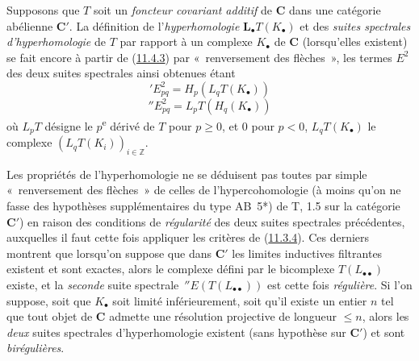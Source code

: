 \begin{env}[11.6.2]
\label{0.11.6.2-fr}
Supposons que $T$ soit un \emph{foncteur covariant additif} de $\boldsymbol{C}$ dans une
catégorie abélienne $\boldsymbol{C}'$. La définition de
l'\emph{hyperhomologie} $\mathbf{L}_\bullet T(K_\bullet)$ et des \emph{suites
spectrales d'hyperhomologie} de $T$ par rapport à un complexe $K_\bullet$ de
$\boldsymbol{C}$ (lorsqu'elles existent) se fait encore à partir de
(\hyperref[0.11.4.3-fr]{11.4.3}) par «~renversement des flèches~», les termes
$E^2$ des deux suites spectrales ainsi obtenues étant
\[
\label{0.11.6.2.1-fr}
\tag{11.6.2.1}
{}'E^2_{pq}=H_p(L_qT(K_\bullet))
\]
\[
\label{0.11.6.2.2-fr}
\tag{11.6.2.2}
{}''E^2_{pq}=L_pT(H_q(K_\bullet))
\]
où $L_pT$ désigne le $p$\textsuperscript{e} dérivé de $T$ pour $p\geq 0$, et $0$
pour $p<0$, $L_qT(K_\bullet)$ le complexe
$(L_qT(K_i))_{i\in\mathbb Z}$.

Les propriétés de l'hyperhomologie ne se déduisent pas toutes par simple
«~renversement des flèches~» de celles de l'hypercohomologie (à moins qu'on
ne fasse des hypothèses supplémentaires du type AB~5*) de T, 1.5 sur la
catégorie $\boldsymbol{C}'$) en raison des conditions de \emph{régularité} des deux
suites spectrales précédentes, auxquelles il faut cette fois appliquer les
critères de (\hyperref[0.11.3.4-fr]{11.3.4}). Ces derniers montrent que
lorsqu'on suppose que dans $\boldsymbol{C}'$ les limites inductives filtrantes
existent et sont exactes, alors le complexe défini par le bicomplexe
$T(L_{\bullet\bullet})$ existe, et la \emph{seconde} suite spectrale
$\,{}''E(T(L_{\bullet\bullet}))$ est cette fois \emph{régulière}. Si l'on suppose,
soit que $K_\bullet$ soit limité inférieurement, soit qu'il existe un entier
$n$ tel que tout objet de $\boldsymbol{C}$ admette une résolution projective de
longueur $\leq n$, alors les \emph{deux} suites spectrales d'hyperhomologie existent
(sans hypothèse sur $\boldsymbol{C}'$) et sont \emph{birégulières}.
\end{env}

